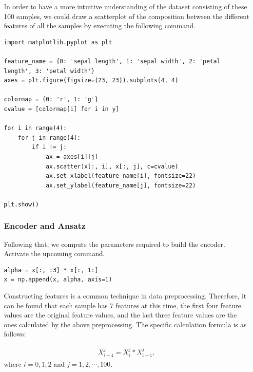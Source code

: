 In order to have a more intuitive understanding of the dataset consisting of these 100 samples, we could draw a scatterplot of the composition between the different features of all the samples by executing the following command.

\begin{lstlisting}
import matplotlib.pyplot as plt

feature_name = {0: 'sepal length', 1: 'sepal width', 2: 'petal length', 3: 'petal width'}
axes = plt.figure(figsize=(23, 23)).subplots(4, 4)

colormap = {0: 'r', 1: 'g'}
cvalue = [colormap[i] for i in y]

for i in range(4):
    for j in range(4):
        if i != j:
            ax = axes[i][j]
            ax.scatter(x[:, i], x[:, j], c=cvalue)
            ax.set_xlabel(feature_name[i], fontsize=22)
            ax.set_ylabel(feature_name[j], fontsize=22)

plt.show()
\end{lstlisting}



\subsubsection{Encoder and Ansatz}
Following that, we compute the parameters required to build the encoder.  Activate the upcoming command.

\begin{lstlisting}
alpha = x[:, :3] * x[:, 1:]
x = np.append(x, alpha, axis=1)
\end{lstlisting}

Constructing features is a common technique in data preprocessing. Therefore, it can be found that each sample has 7 features at this time, the first four feature values are the original feature values, and the last three feature values are the ones calculated by the above preprocessing. The specific calculation formula is as follows:

\begin{eqnarray}\label{5.1dataprocessing}
    X_{i+4}^{j} = X_{i}^{j} * X_{i+1}^{j},
\end{eqnarray}
where $i = 0, 1, 2$ and $j = 1, 2, \cdots, 100$.

